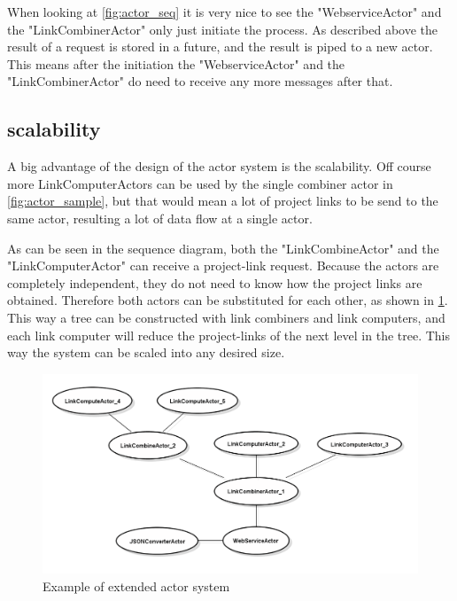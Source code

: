 \documentclass[10pt,a4paper]{article}
\begin{document}


When looking at \ref{fig:actor_seq} it is very nice to see the "WebserviceActor" and the "LinkCombinerActor" only just initiate the process. As described above the result of a request is stored in a future, and the result is piped to a new actor. This means after the initiation the "WebserviceActor" and the "LinkCombinerActor" do need to receive any more messages after that.


\subsection{scalability}

A big advantage of the design of the actor system is the scalability. Off course more LinkComputerActors can be used by the single combiner actor in \ref{fig:actor_sample}, but that would mean a lot of project links to be send to the same actor, resulting a lot of data flow at a single actor. 

As can be seen in the sequence diagram, both the "LinkCombineActor" and the "LinkComputerActor" can receive a project-link request. Because the actors are completely independent, they do not need to know how the project links are obtained. Therefore both actors can be substituted for each other, as shown in  \ref{fig:example_scalable}. This way a tree can be constructed with link combiners and link computers, and each link computer will reduce the project-links of the next level in the tree. This way the system can be scaled into any desired size.

\begin{figure}[htb]
    \centering
    \includegraphics[width=1.00\textwidth]{ActorSystemSampleExtended}
    \caption{Example of extended actor system}
    \label{fig:example_scalable}
\end{figure}
\end{document}
